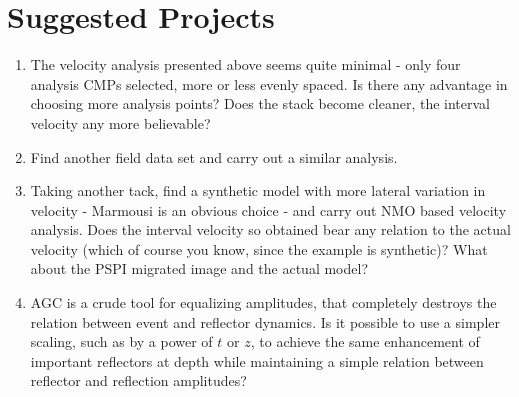 \section{Suggested Projects}
\begin{enumerate}
\item The velocity analysis presented above seems quite minimal - only four analysis CMPs selected, more or less evenly spaced. Is there any advantage in choosing more analysis points? Does the stack become cleaner, the interval velocity any more believable? 

\item Find another field data set and carry out a similar analysis. 

\item Taking another tack, find a synthetic model with more lateral variation in velocity - Marmousi is an obvious choice - and carry out NMO based velocity analysis. Does the interval velocity so obtained bear any relation to the actual velocity (which of course you know, since the example is synthetic)? What about the PSPI migrated image and the actual model?

\item AGC is a crude tool for equalizing amplitudes, that completely destroys the relation between event and reflector dynamics. Is it possible to use a simpler scaling, such as by a power of $t$ or $z$, to  achieve the same enhancement of important reflectors at depth while maintaining a simple relation between reflector and reflection amplitudes?
\end{enumerate}






















